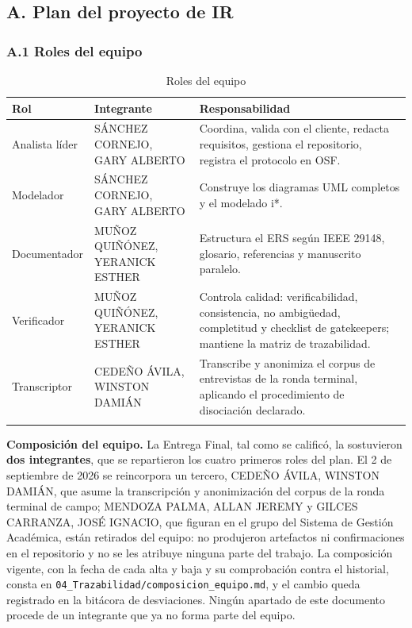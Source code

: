 
\subsection*{A. Plan del proyecto de IR}


\subsubsection*{A.1 Roles del equipo}


\begingroup
\small
\begin{longtable}{|P{0.3333}|P{0.3333}|P{0.3333}|}
\hline
Rol & Integrante & Responsabilidad \\ \hline
Analista líder & SÁNCHEZ CORNEJO, GARY ALBERTO & Coordina, valida con el cliente, redacta requisitos, gestiona el repositorio, registra el protocolo en OSF. \\ \hline
Modelador & SÁNCHEZ CORNEJO, GARY ALBERTO & Construye los diagramas UML completos y el modelado i*. \\ \hline
Documentador & MUÑOZ QUIÑÓNEZ, YERANICK ESTHER & Estructura el ERS según IEEE 29148, glosario, referencias y manuscrito paralelo. \\ \hline
Verificador & MUÑOZ QUIÑÓNEZ, YERANICK ESTHER & Controla calidad: verificabilidad, consistencia, no ambigüedad, completitud y checklist de gatekeepers; mantiene la matriz de trazabilidad. \\ \hline
Transcriptor & CEDEÑO ÁVILA, WINSTON DAMIÁN & Transcribe y anonimiza el corpus de entrevistas de la ronda terminal, aplicando el procedimiento de disociación declarado. \\ \hline
\caption{Roles del equipo}
\end{longtable}
\endgroup

\noindent\textbf{Composición del equipo.} La Entrega Final, tal como se calificó, la sostuvieron \textbf{dos integrantes}, que se repartieron los cuatro primeros roles del plan. El 2 de septiembre de 2026 se reincorpora un tercero, CEDEÑO ÁVILA, WINSTON DAMIÁN, que asume la transcripción y anonimización del corpus de la ronda terminal de campo; MENDOZA PALMA, ALLAN JEREMY y GILCES CARRANZA, JOSÉ IGNACIO, que figuran en el grupo del Sistema de Gestión Académica, están retirados del equipo: no produjeron artefactos ni confirmaciones en el repositorio y no se les atribuye ninguna parte del trabajo. La composición vigente, con la fecha de cada alta y baja y su comprobación contra el historial, consta en \nolinkurl{04_Trazabilidad/composicion_equipo.md}, y el cambio queda registrado en la bitácora de desviaciones. Ningún apartado de este documento procede de un integrante que ya no forma parte del equipo.

